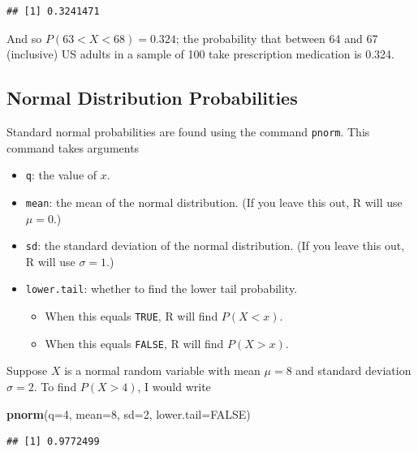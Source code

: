 \documentclass[
]{book}
\newenvironment{Shaded}{\begin{snugshade}}{\end{snugshade}}
\newcommand{\AttributeTok}[1]{\textcolor[rgb]{0.13,0.29,0.53}{#1}}
\newcommand{\ConstantTok}[1]{\textcolor[rgb]{0.56,0.35,0.01}{#1}}
\newcommand{\DecValTok}[1]{\textcolor[rgb]{0.00,0.00,0.81}{#1}}
\newcommand{\FunctionTok}[1]{\textcolor[rgb]{0.13,0.29,0.53}{\textbf{#1}}}
\newcommand{\NormalTok}[1]{#1}
\providecommand{\tightlist}{%
  \setlength{\itemsep}{0pt}\setlength{\parskip}{0pt}}
\begin{document}
\begin{verbatim}
## [1] 0.3241471
\end{verbatim}

And so \(P(63 < X < 68) = 0.324\); the probability that between 64 and 67 (inclusive) US adults in a sample of 100 take prescription medication is 0.324.

\subsection*{Normal Distribution Probabilities}\label{normal-distribution-probabilities-1}

Standard normal probabilities are found using the command \texttt{pnorm}. This command takes arguments

\begin{itemize}
\tightlist
\item
  \texttt{q}: the value of \(x\).
\item
  \texttt{mean}: the mean of the normal distribution. (If you leave this out, R will use \(\mu=0\).)
\item
  \texttt{sd}: the standard deviation of the normal distribution. (If you leave this out, R will use \(\sigma=1\).)
\item
  \texttt{lower.tail}: whether to find the lower tail probability.

  \begin{itemize}
  \tightlist
  \item
    When this equals \texttt{TRUE}, R will find \(P(X < x)\).
  \item
    When this equals \texttt{FALSE}, R will find \(P(X > x)\).
  \end{itemize}
\end{itemize}

Suppose \(X\) is a normal random variable with mean \(\mu=8\) and standard deviation \(\sigma=2\). To find \(P(X > 4)\), I would write

\begin{Shaded}
\begin{Highlighting}[]
\FunctionTok{pnorm}\NormalTok{(}\AttributeTok{q=}\DecValTok{4}\NormalTok{, }\AttributeTok{mean=}\DecValTok{8}\NormalTok{, }\AttributeTok{sd=}\DecValTok{2}\NormalTok{, }\AttributeTok{lower.tail=}\ConstantTok{FALSE}\NormalTok{)}
\end{Highlighting}
\end{Shaded}

\begin{verbatim}
## [1] 0.9772499
\end{verbatim}
\end{document}

